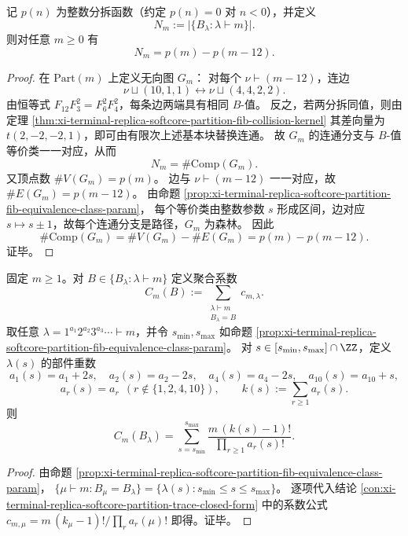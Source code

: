 \begin{theorem}[分拆迹值去重计数的精确闭式]\label{thm:xi-terminal-replica-softcore-partition-fib-distinct-count-exact}
记 \(p(n)\) 为整数分拆函数（约定 \(p(n)=0\) 对 \(n<0\)），并定义
\[
N_m:=\bigl|\{B_\lambda:\lambda\vdash m\}\bigr|.
\]
则对任意 \(m\ge 0\) 有
\[
N_m=p(m)-p(m-12).
\]
\end{theorem}
\begin{proof}
在 \(\mathrm{Part}(m)\) 上定义无向图 \(G_m\)：
对每个 \(\nu\vdash(m-12)\)，连边
\[
\nu\sqcup(10,1,1)\longleftrightarrow \nu\sqcup(4,4,2,2).
\]
由恒等式 \(F_{12}F_3^2=F_6^2F_4^2\)，每条边两端具有相同 \(B\)-值。
反之，若两分拆同值，则由定理
\ref{thm:xi-terminal-replica-softcore-partition-fib-collision-kernel}
其差向量为 \(t(2,-2,-2,1)\)，即可由有限次上述基本块替换连通。
故 \(G_m\) 的连通分支与 \(B\)-值等价类一一对应，从而
\[
N_m=\#\mathrm{Comp}(G_m).
\]
又顶点数 \(\#V(G_m)=p(m)\)。
边与 \(\nu\vdash(m-12)\) 一一对应，故 \(\#E(G_m)=p(m-12)\)。
由命题 \ref{prop:xi-terminal-replica-softcore-partition-fib-equivalence-class-param}，
每个等价类由整数参数 \(s\) 形成区间，边对应 \(s\mapsto s\pm1\)，故每个连通分支是路径，\(G_m\) 为森林。
因此
\[
\#\mathrm{Comp}(G_m)=\#V(G_m)-\#E(G_m)=p(m)-p(m-12).
\]
证毕。
\end{proof}

\begin{proposition}[同值聚合系数的显式求和公式]\label{prop:xi-terminal-replica-softcore-partition-fib-aggregated-coeff}
固定 \(m\ge 1\)。对
\(
B\in\{B_\lambda:\lambda\vdash m\}
\)
定义聚合系数
\[
C_m(B):=\sum_{\substack{\lambda\vdash m\\ B_\lambda=B}}c_{m,\lambda}.
\]
取任意 \(\lambda=1^{a_1}2^{a_2}3^{a_3}\cdots\vdash m\)，并令 \(s_{\min},s_{\max}\) 如命题
\ref{prop:xi-terminal-replica-softcore-partition-fib-equivalence-class-param}。
对 \(s\in[s_{\min},s_{\max}]\cap\ZZ\)，定义 \(\lambda(s)\) 的部件重数
\[
a_1(s)=a_1+2s,\quad a_2(s)=a_2-2s,\quad a_4(s)=a_4-2s,\quad a_{10}(s)=a_{10}+s,
\]
\[
a_r(s)=a_r\ \ (r\notin\{1,2,4,10\}),\qquad
k(s):=\sum_{r\ge 1}a_r(s).
\]
则
\[
C_m(B_\lambda)=\sum_{s=s_{\min}}^{s_{\max}}
\frac{m\,(k(s)-1)!}{\prod_{r\ge 1}a_r(s)!}.
\]
\end{proposition}
\begin{proof}
由命题 \ref{prop:xi-terminal-replica-softcore-partition-fib-equivalence-class-param}，
\(
\{\mu\vdash m:B_\mu=B_\lambda\}
=\{\lambda(s):s_{\min}\le s\le s_{\max}\}
\)。
逐项代入结论
\ref{con:xi-terminal-replica-softcore-partition-trace-closed-form}
中的系数公式
\(
c_{m,\mu}=m\,(k_\mu-1)!/\prod_r a_r(\mu)!
\)
即得。证毕。
\end{proof}

